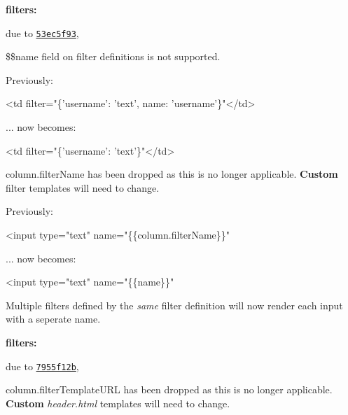 \begin{DoxyItemize}
\item {\bfseries filters\+:}
\begin{DoxyItemize}
\item due to \href{https://github.com/esvit/ng-table/commit/53ec5f931ada71be763b98a3f8d7166bc59a383f}{\tt 53ec5f93},
\end{DoxyItemize}
\item \$\$name field on filter definitions is not supported.
\end{DoxyItemize}

Previously\+:


\begin{DoxyCode}
<td filter="\{'username': 'text', $$name: 'username'\}"</td>
\end{DoxyCode}
 ... now becomes\+:


\begin{DoxyCode}
<td filter="\{'username': 'text'\}"</td>
\end{DoxyCode}



\begin{DoxyItemize}
\item column.\+filter\+Name has been dropped as this is no longer applicable. {\bfseries Custom} filter templates will need to change.
\end{DoxyItemize}

Previously\+:


\begin{DoxyCode}
<input type="text" name="\{\{column.filterName\}\}"
\end{DoxyCode}
 ... now becomes\+:


\begin{DoxyCode}
<input type="text" name="\{\{name\}\}"
\end{DoxyCode}



\begin{DoxyItemize}
\item Multiple filters defined by the {\itshape same} filter definition will now render each input with a seperate name.
\item {\bfseries filters\+:}
\begin{DoxyItemize}
\item due to \href{https://github.com/esvit/ng-table/commit/7955f12ba96eb8a5f047484d83f3c53a2954f1db}{\tt 7955f12b},
\end{DoxyItemize}
\item column.\+filter\+Template\+U\+RL has been dropped as this is no longer applicable. {\bfseries Custom} {\itshape header.\+html} templates will need to change.
\end{DoxyItemize}

